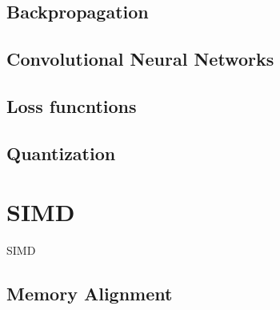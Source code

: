 \subsection{Backpropagation}

\subsection{Convolutional Neural Networks}


\subsection{Loss funcntions}


\subsection{Quantization}

\section{SIMD}

\ac{SIMD}

\subsection{Memory Alignment}

